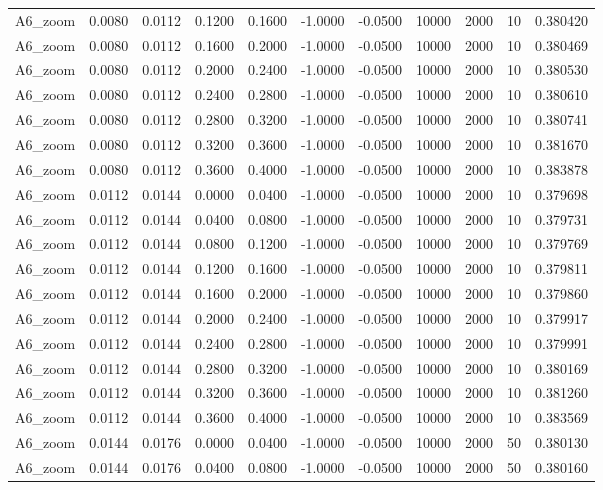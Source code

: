 \documentclass{article}
\begin{document}
\begin{longtable}{l r r r r r r r r r l}
A6_zoom & 0.0080 & 0.0112 & 0.1200 & 0.1600 & -1.0000 & -0.0500 & 10000 & 2000 & 10 & 0.380420 \\
A6_zoom & 0.0080 & 0.0112 & 0.1600 & 0.2000 & -1.0000 & -0.0500 & 10000 & 2000 & 10 & 0.380469 \\
A6_zoom & 0.0080 & 0.0112 & 0.2000 & 0.2400 & -1.0000 & -0.0500 & 10000 & 2000 & 10 & 0.380530 \\
A6_zoom & 0.0080 & 0.0112 & 0.2400 & 0.2800 & -1.0000 & -0.0500 & 10000 & 2000 & 10 & 0.380610 \\
A6_zoom & 0.0080 & 0.0112 & 0.2800 & 0.3200 & -1.0000 & -0.0500 & 10000 & 2000 & 10 & 0.380741 \\
A6_zoom & 0.0080 & 0.0112 & 0.3200 & 0.3600 & -1.0000 & -0.0500 & 10000 & 2000 & 10 & 0.381670 \\
A6_zoom & 0.0080 & 0.0112 & 0.3600 & 0.4000 & -1.0000 & -0.0500 & 10000 & 2000 & 10 & 0.383878 \\
A6_zoom & 0.0112 & 0.0144 & 0.0000 & 0.0400 & -1.0000 & -0.0500 & 10000 & 2000 & 10 & 0.379698 \\
A6_zoom & 0.0112 & 0.0144 & 0.0400 & 0.0800 & -1.0000 & -0.0500 & 10000 & 2000 & 10 & 0.379731 \\
A6_zoom & 0.0112 & 0.0144 & 0.0800 & 0.1200 & -1.0000 & -0.0500 & 10000 & 2000 & 10 & 0.379769 \\
A6_zoom & 0.0112 & 0.0144 & 0.1200 & 0.1600 & -1.0000 & -0.0500 & 10000 & 2000 & 10 & 0.379811 \\
A6_zoom & 0.0112 & 0.0144 & 0.1600 & 0.2000 & -1.0000 & -0.0500 & 10000 & 2000 & 10 & 0.379860 \\
A6_zoom & 0.0112 & 0.0144 & 0.2000 & 0.2400 & -1.0000 & -0.0500 & 10000 & 2000 & 10 & 0.379917 \\
A6_zoom & 0.0112 & 0.0144 & 0.2400 & 0.2800 & -1.0000 & -0.0500 & 10000 & 2000 & 10 & 0.379991 \\
A6_zoom & 0.0112 & 0.0144 & 0.2800 & 0.3200 & -1.0000 & -0.0500 & 10000 & 2000 & 10 & 0.380169 \\
A6_zoom & 0.0112 & 0.0144 & 0.3200 & 0.3600 & -1.0000 & -0.0500 & 10000 & 2000 & 10 & 0.381260 \\
A6_zoom & 0.0112 & 0.0144 & 0.3600 & 0.4000 & -1.0000 & -0.0500 & 10000 & 2000 & 10 & 0.383569 \\
A6_zoom & 0.0144 & 0.0176 & 0.0000 & 0.0400 & -1.0000 & -0.0500 & 10000 & 2000 & 50 & 0.380130 \\
A6_zoom & 0.0144 & 0.0176 & 0.0400 & 0.0800 & -1.0000 & -0.0500 & 10000 & 2000 & 50 & 0.380160 \\

\end{longtable}
\end{document}
